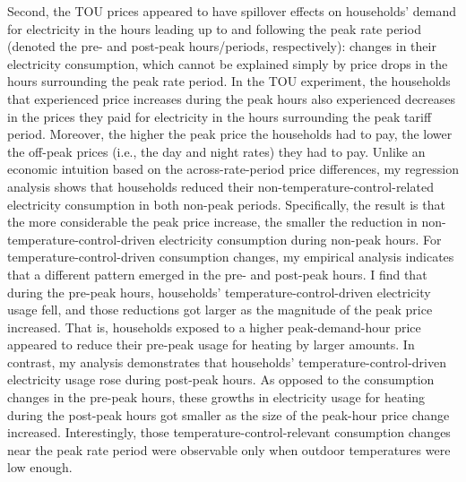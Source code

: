 Second, the TOU prices appeared to have spillover effects on households' demand for electricity in the hours leading up to and following the peak rate period (denoted the pre- and post-peak hours/periods, respectively): changes in their electricity consumption, which cannot be explained simply by price drops in the hours surrounding the peak rate period. In the TOU experiment, the households that experienced price increases during the peak hours also experienced decreases in the prices they paid for electricity in the hours surrounding the peak tariff period. Moreover, the higher the peak price the households had to pay, the lower the off-peak prices (i.e., the day and night rates) they had to pay. Unlike an economic intuition based on the across-rate-period price differences, my regression analysis shows that households reduced their non-temperature-control-related electricity consumption in both non-peak periods. Specifically, the result is that the more considerable the peak price increase, the smaller the reduction in non-temperature-control-driven electricity consumption during non-peak hours. For temperature-control-driven consumption changes, my empirical analysis indicates that a different pattern emerged in the pre- and post-peak hours. I find that during the pre-peak hours, households' temperature-control-driven electricity usage fell, and those reductions got larger as the magnitude of the peak price increased. That is, households exposed to a higher peak-demand-hour price appeared to reduce their pre-peak usage for heating by larger amounts. In contrast, my analysis demonstrates that households' temperature-control-driven electricity usage rose during post-peak hours. As opposed to the consumption changes in the pre-peak hours, these growths in electricity usage for heating during the post-peak hours got smaller as the size of the peak-hour price change increased. Interestingly, those temperature-control-relevant consumption changes near the peak rate period were observable only when outdoor temperatures were low enough. 

